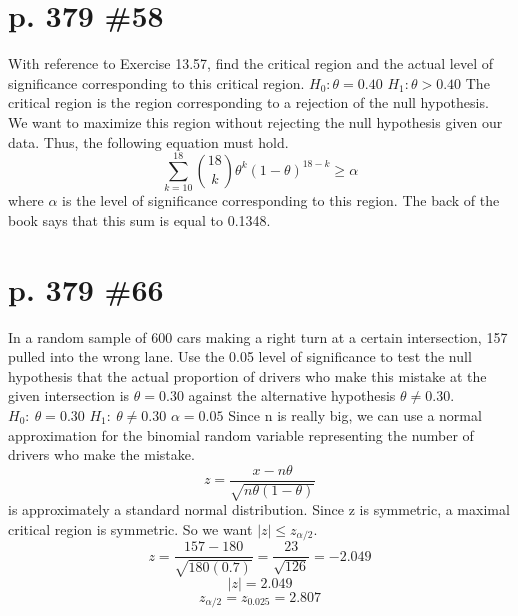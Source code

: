 \documentclass[12pt]{article}
\begin{document}
	\section[20pt]{p. 379 \#58}
	With reference to Exercise 13.57, find the critical region and the actual level of significance corresponding to this critical region.
	\newline \newline
	\(H_0: \theta = 0.40\)
	\newline
	\(H_1: \theta > 0.40\)
	\newline \newline
	The critical region is the region corresponding to a rejection of the null hypothesis. We want to maximize this region without rejecting the null hypothesis given our data.
	\newline
	Thus, the following equation must hold.
	\[\sum_{k=10}^{18}\binom{18}{k}\theta^k(1-\theta)^{18-k} \geq \alpha\]
	where \(\alpha\) is the level of significance corresponding to this region.
	\newline \newline
	The back of the book says that this sum is equal to 0.1348.
	\newline
	\newpage
	\section[20pt]{p. 379 \#66}
	In a random sample of 600 cars making a right turn at a certain intersection, 157 pulled into the wrong lane. Use the 0.05 level of significance to test the null hypothesis that the actual proportion of drivers who make this mistake at the given intersection is \(\theta = 0.30\) against the alternative hypothesis \(\theta \neq 0.30\).
	\newline \newline
	\(H_0:\ \theta = 0.30\)
	\newline
	\(H_1:\ \theta \neq 0.30\)
	\newline
	\(\alpha = 0.05\)
	\newline \newline
	Since n is really big, we can use a normal approximation for the binomial random variable representing the number of drivers who make the mistake.
	\newline
	\[z = \frac{x-n\theta}{\sqrt{n\theta(1-\theta)}}\]
	is approximately a standard normal distribution.
	\newline
	Since z is symmetric, a maximal critical region is symmetric.
	\newline
	So we want \(|z| \leq z_{\alpha/2}\).
	\newline
	\[z = \frac{157-180}{\sqrt{180(0.7)}} = \frac{23}{\sqrt{126}} = -2.049\]
	\[|z| = 2.049\]
	\[z_{\alpha/2} = z_{0.025} = 2.807\]
\end{document}
